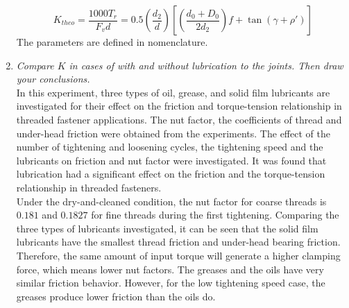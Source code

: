 \begin{enumerate}
	\[ K_{theo} = \dfrac{1000T_r}{F_vd} = 0.5\left(\dfrac{d_2}{d}\right)\left[\left(\dfrac{d_{0}+D_0}{2d_2}\right)f + \tan(\gamma+\rho')\right] \]
	The parameters are defined in nomenclature.
	\item \emph{Compare $ K $ in cases of with and without lubrication to the joints. Then draw your conclusions.}\\
	In this experiment, three types of oil, grease, and solid film lubricants are investigated for their effect on the friction and torque-tension relationship in threaded fastener applications. The nut factor, the coefficients of thread and under-head friction were obtained from the experiments. The effect of the number of tightening and loosening cycles, the tightening speed and the lubricants on friction and nut factor were investigated. It was found that lubrication had a significant effect on the friction and the torque-tension relationship in threaded fasteners.\\
	Under the dry-and-cleaned condition, the nut factor for coarse threads is $ 0.181 $ and $ 0.1827 $ for fine threads during the first tightening. Comparing the three types of lubricants investigated, it can be seen that the solid film lubricants have the smallest thread friction and under-head bearing friction. Therefore, the same amount of input torque will generate a higher clamping force, which means lower nut factors. The greases and the oils have very similar friction behavior. However, for the low tightening speed case, the greases produce lower friction than the oils do.
\end{enumerate}